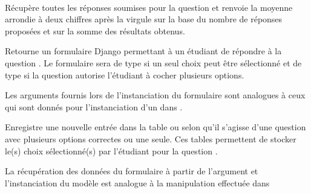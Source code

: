\documentclass[a4,10pt,french]{sphinxmanual}
\begin{document}
\begin{fulllineitems}
\label{source:quiz.models.Qcm}~

\begin{fulllineitems}
\label{source:quiz.models.Qcm.average_result}
Récupère toutes les réponses soumises pour la question et renvoie la moyenne
arrondie à deux chiffres après la virgule sur la base du nombre de réponses
proposées et sur la somme des résultats obtenus.

\end{fulllineitems}


\begin{fulllineitems}
\label{source:quiz.models.Qcm.create_form}
Retourne un formulaire Django permettant à un étudiant de répondre à la question
. Le formulaire sera de type  si un seul choix
peut être sélectionné et de type  si la question autorise
l'étudiant à cocher plusieurs options.

Les arguments fournis lors de l'instanciation du formulaire sont analogues
à ceux qui sont donnés pour l'instanciation d'un  dans {\hyperref[source:quiz.models.SimpleQuestion.create_form]{\emph{}}}.

\end{fulllineitems}


\begin{fulllineitems}
\label{source:quiz.models.Qcm.save_submit}
Enregistre une nouvelle entrée dans la table {\hyperref[source:quiz.models.QcmSubmitMulti]{\emph{}}}
ou {\hyperref[source:quiz.models.QcmSubmitOne]{\emph{}}} selon qu'il s'agisse d'une question avec
plusieurs options correctes ou une seule. Ces tables permettent de stocker
le(s) choix sélectionné(s) par l'étudiant pour la question .

La récupération des données du formulaire à partir de l'argument 
et l'instanciation du modèle est analogue à la manipulation effectuée dans {\hyperref[source:quiz.models.SimpleQuestion.save_submit]{\emph{}}}

\end{fulllineitems}


\end{fulllineitems}
\end{document}
